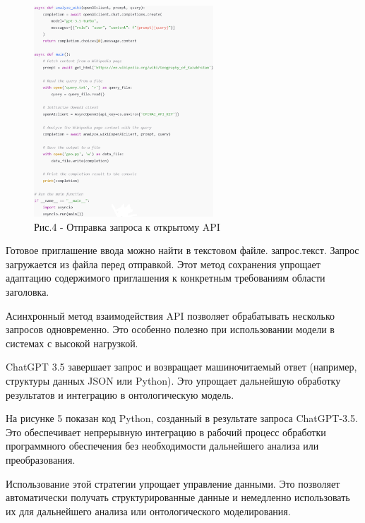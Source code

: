 \begin{figure}[H]
	\centering
	\includegraphics[width=0.6\textwidth]{media/ict2/image152}
	\caption*{Рис.4 - Отправка запроса к открытому API}
\end{figure}

\begin{multicols}{2}
Готовое приглашение ввода можно найти в текстовом файле. запрос.текст.
Запрос загружается из файла перед отправкой. Этот метод сохранения
упрощает адаптацию содержимого приглашения к конкретным требованиям
области заголовка.

Асинхронный метод взаимодействия API позволяет обрабатывать несколько
запросов одновременно. Это особенно полезно при использовании модели в
системах с высокой нагрузкой.

ChatGPT 3.5 завершает запрос и возвращает машиночитаемый ответ
(например, структуры данных JSON или Python). Это упрощает дальнейшую
обработку результатов и интеграцию в онтологическую модель.

На рисунке 5 показан код Python, созданный в результате запроса
ChatGPT-3.5. Это обеспечивает непрерывную интеграцию в рабочий процесс
обработки программного обеспечения без необходимости дальнейшего анализа
или преобразования.

Использование этой стратегии упрощает управление данными. Это позволяет
автоматически получать структурированные данные и немедленно
использовать их для дальнейшего анализа или онтологического
моделирования.
\end{multicols}

